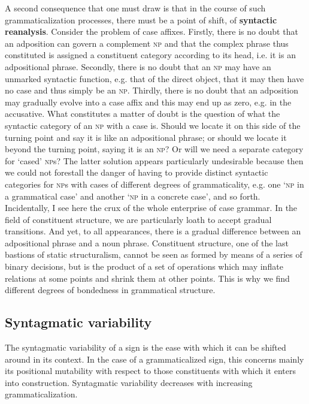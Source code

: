 A second consequence that one must draw is that in the course of such grammaticalization processes, there must be a point of shift, of \textbf{syntactic reanalysis}. Consider the problem of case affixes. Firstly, there is no doubt that an adposition can govern a complement \textsc{np} and that the complex phrase thus constituted is assigned a constituent category according to its head, i.e. it is an adpositional phrase. Secondly, there is no doubt that an \textsc{np} may have an unmarked syntactic function, e.g. that of the direct object, that it may then have no case and thus simply be an \textsc{np}. Thirdly, there is no doubt that an adposition may gradually evolve into a case affix and this may end up as zero, e.g. in the accusative. What constitutes a matter of doubt is the question of what the syntactic category of an \textsc{np} with a case is. Should we locate it on this side of the turning point and say it is like an adpositional phrase; or should we locate it beyond the turning point, saying it is an \textsc{np}? Or will we need a separate category for ‘cased’ \textsc{np}s? The latter solution appears particularly undesirable because then we could not forestall the danger of having to provide distinct syntactic categories for \textsc{np}s with cases of different degrees of grammaticality, e.g. one ‘\textsc{np} in a grammatical case’ and another ‘\textsc{np} in a concrete case’, and so forth. Incidentally, I see here the crux of the whole enterprise of case grammar. In the field of constituent structure, we are particularly loath to accept gradual transitions. And yet, to all appearances, there is a gradual difference between an adpositional phrase and a noun phrase. Constituent structure, one of the last bastions of static structuralism, cannot be seen as formed by means of a series of binary decisions, but is the product of a set of operations which may inflate relations at some points and shrink them at other points. This is why we find different degrees of bondedness in grammatical structure.

\subsection{Syntagmatic variability}

The syntagmatic variability of a sign is the ease with which it can be shifted around in its context. In the case of a grammaticalized sign, this concerns mainly its positional mutability with respect to those constituents with which it enters into construction. Syntagmatic variability decreases with increasing grammaticalization.

